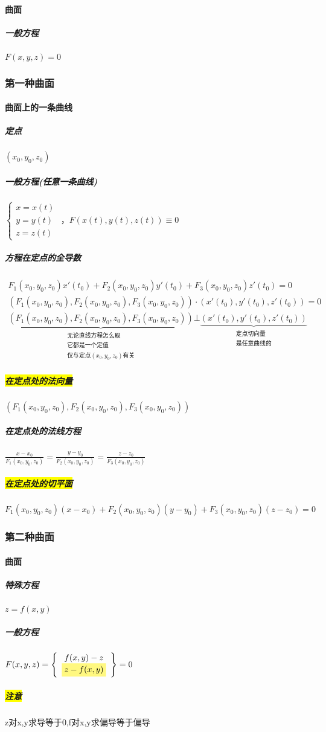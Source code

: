 \documentclass[UTF8,a4paper,12pt,scheme=chinese]{ctexbook}
\newcommand{\hl}[1]{\colorbox{yellow}{#1}}
\newcommand{\hla}[1]{%
	\colorbox{yellow!50}{$\displaystyle#1$}}
\theoremstyle{plain}
\begin{document}
	\paragraph{曲面}
	\subparagraph{一般方程} $F(x,y,z)=0$
	\subsubsection{第一种曲面}
	\paragraph{曲面上的一条曲线}
	\subparagraph{定点} $(x_0,y_0,z_0)$
	\subparagraph{一般方程(任意一条曲线)}$\left\{\begin{array}{l}
	x=x(t) \\ 
	y=y(t) \\ 
	z=z(t)
	\end{array}\right. $
	，$F(x(t),y(t),z(t))\equiv0$
	\subparagraph{方程在定点的全导数} $\begin{array}{l}
	F_1(x_0,y_0,z_0)x'(t_0)+F_2(x_0,y_0,z_0)y'(t_0)+F_3(x_0,y_0,z_0)z'(t_0)=0 \\ 
	(F_1(x_0,y_0,z_0),F_2(x_0,y_0,z_0),F_3(x_0,y_0,z_0))\cdot(x'(t_0),y'(t_0),z'(t_0))=0\\
	\underbrace{(F_1(x_0,y_0,z_0),F_2(x_0,y_0,z_0),F_3(x_0,y_0,z_0))}_{\begin{array}{c}
		\mbox{无论直线方程怎么取} \\ 
		\mbox{它都是一个定值}\\
		\mbox{仅与定点}(x_0,y_0,z_0)\mbox{有关}
		\end{array} }\bot
	\underbrace{(x'(t_0),y'(t_0),z'(t_0))}_{
	\begin{array}{c}
	\mbox{定点切向量} \\ 
	\mbox{是任意曲线的}
	\end{array}
	}
\end{array}$
	\subparagraph{\hl{在定点处的法向量}}$ (F_1(x_0,y_0,z_0),F_2(x_0,y_0,z_0),F_3(x_0,y_0,z_0)) $
	\subparagraph{在定点处的法线方程}$\frac{x-x_0}{F_1(x_0,y_0,z_0)}=\frac{y-y_0}{F_2(x_0,y_0,z_0)}=\frac{z-z_0}{F_3(x_0,y_0,z_0)}$
	\subparagraph{\hl{在定点处的切平面}}$ F_1(x_0,y_0,z_0)(x-x_0)+F_2(x_0,y_0,z_0)(y-y_0)+F_3(x_0,y_0,z_0)(z-z_0)=0 $
	\subsubsection{第二种曲面}
	\paragraph{曲面}
	\subparagraph{特殊方程} $z=f(x,y)$
	\subparagraph{一般方程} $F(x,y,z)=\left\{\begin{array}{c}
	f(x,y)-z \\ 
	\hla{z-f(x,y)}
	\end{array}\right\} =0$
	\subparagraph{\hl{注意}}z对x,y求导等于0,f对x,y求偏导等于偏导
\end{document}
